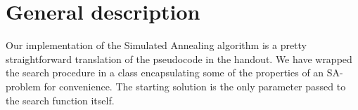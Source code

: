\section*{General description}

Our implementation of the Simulated Annealing algorithm is a pretty straightforward translation of the pseudocode in the handout.
We have wrapped the search procedure in a class encapsulating some of the properties of an SA-problem for convenience.
The starting solution is the only parameter passed to the search function itself.


